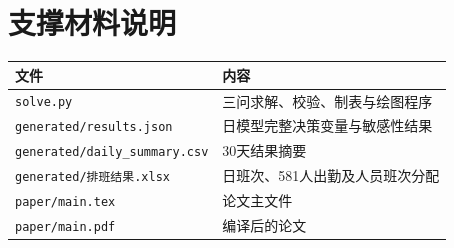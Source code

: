 \section{支撑材料说明}

\begin{table}[htbp]
\centering
\begin{tabular}{ll}
\toprule
文件 & 内容\\
\midrule
\texttt{solve.py} & 三问求解、校验、制表与绘图程序\\
\texttt{generated/results.json} & 日模型完整决策变量与敏感性结果\\
\texttt{generated/daily\_summary.csv} & 30天结果摘要\\
\texttt{generated/排班结果.xlsx} & 日班次、581人出勤及人员班次分配\\
\texttt{paper/main.tex} & 论文主文件\\
\texttt{paper/main.pdf} & 编译后的论文\\
\bottomrule
\end{tabular}
\end{table}
